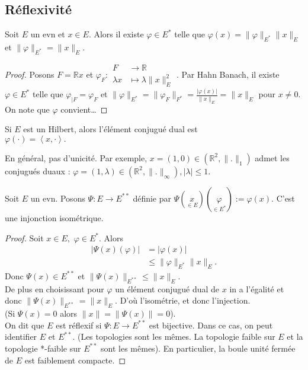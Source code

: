 \subsection{Réflexivité}
\begin{propriete}
    Soit $E$ un evn et $x\in E.$ Alors il existe $\varphi \in E^*$ telle que $\varphi (x)=\|\varphi \|_{E^*}\|x\|_E$ et $\|\varphi \|_{E^*}=\|x\|_E.$
\end{propriete}
\begin{proof}
    Posons $F=\mathbb{R} x$ et $\varphi _F :\begin{aligned}
        F &\longrightarrow \mathbb{R}  \\
        \lambda x &\longmapsto \lambda \|x\|_E^2
    \end{aligned}.$ Par Hahn Banach, il existe $\varphi \in E^*$ telle que $\varphi _{|F}=\varphi _F$ et $\|\varphi \|_{E^*}=\|\varphi _F\|_{F^*}=\frac{|\varphi (x)|}{\|x\|_E}=\|x\|_E $ pour $x\neq 0.$ On note que $\varphi $ convient\ldots
\end{proof}
\begin{remarque}
    Si $E$ est un Hilbert, alors  l'élément conjugué dual est\\ $\varphi (\cdot)=\left<x,\cdot \right>.$
\end{remarque}
\begin{remarque}
    En général, pas d'unicité. Par exemple,  $x=(1,0)\in \left( \mathbb{R} ^2, \|.\|_1 \right) $ admet les conjugués duaux : $\varphi =(1,\lambda)\in \left( \mathbb{R} ^2, \|.\|_\infty \right), |\lambda| \le 1 $.
\end{remarque}
\begin{corollaire}
    Soit $E$ un evn. Posons $\Psi:E\to E^{**}$ définie par $\Psi(\underset{\in E}{x})(\underset{\in E^*}{\varphi }):=\varphi (x).$ C'est une injonction isométrique.
\end{corollaire}
\begin{proof}
    Soit $x\in E,$ $\varphi \in E^*.$ Alors
    \begin{align*}
        |\Psi(x)(\varphi )| &=|\varphi (x)|\\
                            &\le \|\varphi \|_{E^*}\|x\|_E.
    \end{align*}
    Donc $\Psi(x)\in E^{**}$ et $\|\Psi(x)\|_{E^{* *}}\le \|x\|_E.$  \\
    De plus en choisissant pour $\varphi $ un élément conjugué dual de $x$ in a l'égalité et donc $\|\Psi(x)\|_{E^{* *}}=\|x\|_E.$ D'où l'isométrie, et donc l'injection.\\
    (Si $\Psi(x)=0$ alors $\|x\|=\|\Psi(x)\|=0$).\\
    On dit que $E$ est réflexif si $\Psi:E\to E^{* * }$ est bijective. Dans ce cas, on peut identifier $E$ et $E^{* *}.$ (Les topologies sont les mêmes. La topologie faible sur $E$ et la topologie *-faible sur $E^{* *}$ sont les mêmes). En particulier, la boule unité fermée de $E$ est faiblement compacte.
\end{proof}
